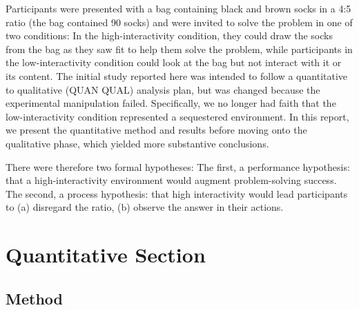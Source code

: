\documentclass[twocolumn, serif, empirical, authordate]{jote-article}
\begin{document}
Participants were presented with a bag containing black and brown socks in a 4:5 ratio (the bag contained 90 socks) and were invited to solve the problem in one of two conditions: In the high-interactivity condition, they could draw the socks from the bag as they saw fit to help them solve the problem, while participants in the low-interactivity condition could look at the bag but not interact with it or its content.
The initial study reported here was intended to follow a quantitative to qualitative (QUAN QUAL) analysis plan, but was changed because the experimental manipulation failed. Specifically, we no longer had faith that the low-interactivity condition represented a sequestered environment. In this report, we present the quantitative method and results before moving onto the qualitative phase, which yielded more substantive conclusions.

There were therefore two formal hypotheses: The first, a performance hypothesis: that a high-interactivity environment would augment problem-solving success. The second, a process hypothesis: that high interactivity would lead participants to (a) disregard the ratio, (b) observe the answer in their actions.


\section{Quantitative Section}


\subsection{Method}
\end{document}
